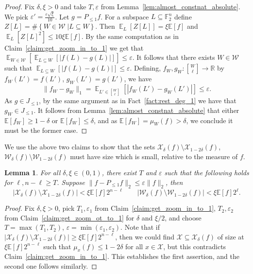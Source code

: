 \documentclass[11pt]{article}
\newtheorem{lemma}[thm]{Lemma}
\newcommand\E{\mathbb{E}}
\newcommand\card[1]{\left| {#1} \right|}
\newcommand\sett[2]{\left\{ \left. #1 \;\right\vert #2 \right\}}
\newcommand\norm[1]{\| #1 \|}
\newcommand\Expect[2]{{\mathop{\mathbb{E}}_{#1}\left[ {#2} \right]}}
\newcommand\eps{\varepsilon}
\renewcommand\geq{\geqslant}
\renewcommand\leq{\leqslant}
\providecommand{\sqbinom}[2]{\genfrac{[}{]}{0pt}{}{#1}{#2}}
\begin{document}
\begin{proof}
    Fix $\delta,\xi>0$ and take $T,\eps$ from Lemma~\ref{lem:almost_constnat_absolute}. We pick $\eps' = \frac{\eps\sqrt{\xi}}{10}$.
    Let $g = P_{\leq 1}f$. 
    For a subspace $L\subseteq\mathbb{F}_2^n$ define $Z[L] = \#\sett{W\in \mathcal{W}}{L\subseteq W}$. 
    Then $\Expect{L}{Z[L]}=\xi\E[f]$ and 
    $\Expect{L}{Z[L]^2}\leq 10\xi \E[f]$.
    By the same computation as in Claim~\ref{claim:get_zoom_in_to_1} we get that $\Expect{W\in \mathcal{W}}{\Expect{L\subseteq W}{\card{f(L)-g(L)}}}\leq \eps$. It follows that there exists $W\in \mathcal{W}$ such that 
    $\Expect{L\subseteq W}{\card{f(L)-g(L)}}\leq \eps$. Defining, $f_W, g_W\colon {\sqbinom{W}{\ell}}\to\mathbb{R}$ by
    $f_W(L') = f(L')$, 
    $g_W(L') = g(L')$, we have
    \[
    \norm{f_W-g_W}_1=\Expect{L'\in {\sqbinom{W}{\ell}}}{\card{f_W(L')-g_W(L')}}\leq \eps.
    \]
    As $g\in J_{\leq 1}$, by the same argument as in Fact~\ref{fact:rest_deg_1} we have that $g_W\in J_{\leq 1}$. It follows from Lemma~\ref{lem:almost_constnat_absolute} that either $\E[f_{W}]\geq 1-\delta$ or $\E[f_W]\leq \delta$, and as $\E[f_W] = \mu_W(f)> \delta$, we conclude it must be the former case.
\end{proof}

We use the above two claims to show that the sets 
$\mathcal{X}_{\delta}(f)\setminus \mathcal{X}_{1-2\delta}(f)$, $\mathcal{W}_{\delta}(f)\setminus \mathcal{W}_{1-2\delta}(f)$ must have size which is small, relative to the measure of $f$.
\begin{lemma}\label{lem:most_are_close_to_1}
  For all $\delta,\xi\in(0,1)$, there exist $T$ and $\eps$ such that the following holds for $\ell,n-\ell\geq T$. Suppose  
  $\norm{f-P_{\leq 1}f}_2\leq \eps\norm{f}_2$, then
  \[
  \card{\mathcal{X}_{\delta}(f)\setminus \mathcal{X}_{1-2\delta}(f)}<\xi\E[f] 2^{n-\ell}
  \qquad
  \card{\mathcal{W}_{\delta}(f)\setminus \mathcal{W}_{1-2\delta}(f)}<\xi\E[f] 2^{\ell}.
  \]
\end{lemma}
\begin{proof}
    Fix $\delta,\xi>0$, pick $T_1,\eps_1$ from Claim~\ref{claim:get_zoom_in_to_1}, $T_2,\eps_2$ from Claim~\ref{claim:get_zoom_ot_to_1} for $\delta$ and $\xi/2$, and choose $T = \max(T_1,T_2)$, $\eps = \min(\eps_1,\eps_2)$. Note that if 
    $\card{\mathcal{X}_{\delta}(f)\setminus \mathcal{X}_{1-2\delta}(f)}\geq \xi\E[f] 2^{n-\ell}$, then we could find 
    $\mathcal{X}\subseteq \mathcal{X}_{\delta}(f)$ of size at $\xi\E[f]2^{n-\ell}$ such that $\mu_x(f)\leq 1-2\delta$ for all $x\in\mathcal{X}$, but this contradicts Claim~\ref{claim:get_zoom_in_to_1}. This establishes the first assertion, and the second one follows similarly.
\end{proof}
\end{document}
